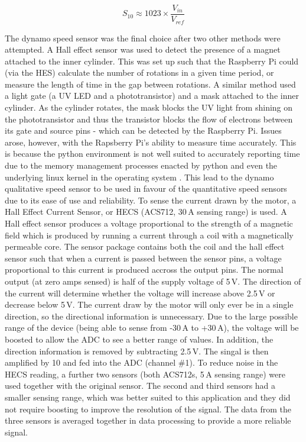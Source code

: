 \documentclass[twoside,a4]{report}
\def\br{\newline \newline \noindent}
\begin{document}
	\begin{equation}
	S_{10} \approx 1023 \times \frac{V_{in}}{V_{ref}}
	\label{eqnadc}
	\end{equation}
	
	
	\noindent
	The dynamo speed sensor was the final choice after two other methods were attempted. A Hall effect sensor was used to detect the presence of a magnet attached to the inner cylinder. This was set up such that the Raspberry Pi could (via the HES) calculate the number of rotations in a given time period, or measure the length of time in the gap between rotations. A similar method used a light gate (a UV LED and a phototransistor) and a mask attached to the inner cylinder. As the cylinder rotates, the mask blocks the UV light from shining on the phototransistor and thus the transistor blocks the flow of electrons between its gate and source pins - which can be detected by the Raspberry Pi. Issues arose, however, with the Rapsberry Pi's ability to measure time accurately. This is because the python environment is not well suited to accurately reporting time due to the memory management processes enacted by python and even the underlying linux kernel in the operating system \cite{backrpibadrealtime}. This lead to the dynamo qualitative speed sensor to be used in favour of the quantitative speed sensors due to its ease of use and reliability.
	\br
	To sense the current drawn by the motor, a Hall Effect Current Sensor, or HECS (ACS712, 30\,A sensing range) is used. A Hall effect sensor produces a voltage proportional to the strength of a magnetic field which is produced by running a current through a coil with a magnetically permeable core. The sensor package contains both the coil and the hall effect sensor such that when a current is passed between the sensor pins, a voltage proportional to this current is produced accross the output pins. The normal output (at zero amps sensed) is half of the supply voltage of 5\,V. The direction of the current will determine whether the voltage will increase above 2.5\,V or decrease below 5\,V. The current draw by the motor will only ever be in a single direction, so the directional information is unnecessary. Due to the large possible range of the device (being able to sense from -30\,A to +30\,A), the voltage will be boosted to allow the ADC to see a better range of values. In addition, the direction information is removed by subtracting 2.5\,V. The singal is then amplified by 10 and fed into the ADC (channel \#1). 
	\br
	To reduce noise in the HECS reading, a further two sensors (both ACS712s, 5\,A sensing range) were used together with the original sensor. The second and third sensors had a smaller sensing range, which was better suited to this application and they did not require boosting to improve the resolution of the signal. The data from the three sensors is averaged together in data processing to provide a more reliable signal.
	
\end{document}
